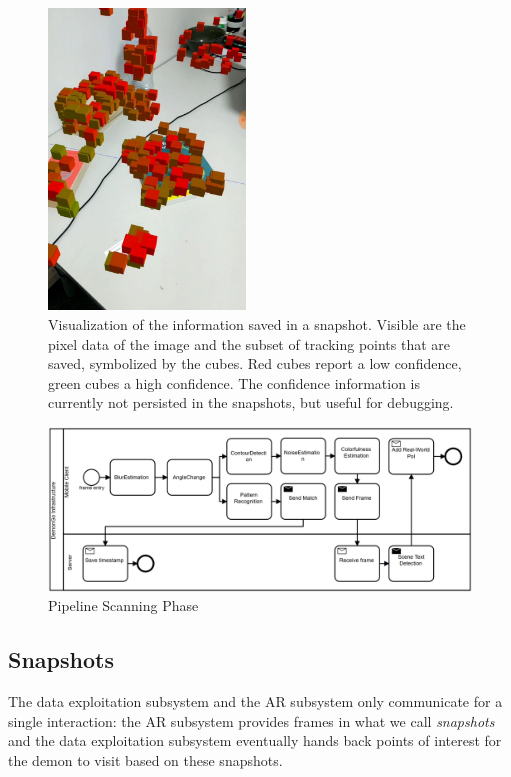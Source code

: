 \begin{figure}
    \centering
    \includegraphics[height=8cm]{graphics/snapshot-points.jpg}
    \caption{Visualization of the information saved in a snapshot. Visible are the pixel data of the image and the subset of tracking points that are saved, symbolized by the cubes. Red cubes report a low confidence, green cubes a high confidence. The confidence information is currently not persisted in the snapshots, but useful for debugging.}
    \label{fig:snapshot_data}
\end{figure}

\label{sec:implementation-data-analysis}
\begin{figure}
    \includegraphics[width=\textwidth]{graphics/new_pipeline_phase_1.png}
    \caption{Pipeline Scanning Phase}
    \label{fig:pipeline_phase1}
\end{figure}

\subsection{Snapshots}
\label{sec:snapshots}
The data exploitation subsystem and the AR subsystem only communicate for a single interaction: the AR subsystem provides frames in what we call \emph{snapshots} and the data exploitation subsystem eventually hands back points of interest for the demon to visit based on these snapshots.

